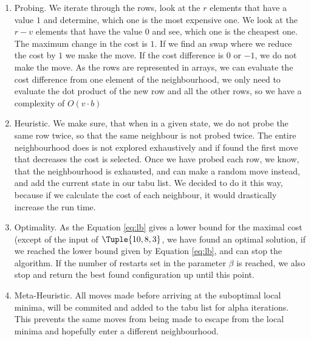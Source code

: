 \begin{enumerate}
\item Probing.  
We iterate through the rows, look at the $r$ elements that have a value $1$ and determine, which one is the most expensive one. We look at the $r-v$ elements that have the value $0$ and see, which one is the cheapest one. The maximum change in the \textsf{cost} is $1$. If we find an swap where we reduce the cost by $1$ we make the move. If the cost difference is $0$ or $-1$, we do not make the move.  
As the rows are represented in arrays, we can evaluate the cost difference from one element of the neighbourhood, we only need to evaluate the dot product of the new row and all the other rows, so we have a complexity of $O(v \cdot b)$
\item Heuristic. We make sure, that when in a given state, we do not probe the same row twice, so that the same neighbour is not probed twice. The entire neighbourhood does is not explored exhaustively and if found the first move that decreases the cost is selected. Once we have probed each row, we know, that the neighbourhood is exhausted, and can make a random move instead, and add the current state in our tabu list. We decided to do it this way, because if we calculate the cost of each neighbour, it would drastically increase the run time. 
\item Optimality. As the Equation \ref{eq:lb} gives a lower bound for the maximal cost (except of the input of $\Tuple{10, 8, 3}$, we have found an optimal solution, if we reached the lower bound given by Equation \ref{eq:lb}, and can stop the algorithm. If the number of restarts set in the parameter $\beta$ is reached, we also stop and return the best found configuration up until this point. 
\item Meta-Heuristic. All moves made before arriving at the suboptimal local minima, will be commited and added to the tabu list for alpha iterations. This prevents the same moves from being made to escape from the local minima and hopefully enter a different neighbourhood.
  

\end{enumerate}
